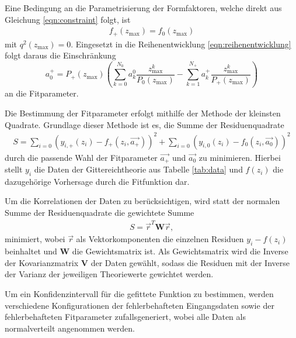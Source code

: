 Eine Bedingung an die Parametrisierung der Formfaktoren, welche direkt aus Gleichung \eqref{eqn:constraint} folgt, ist
\begin{align*}
  f_+(z_\text{max}) = f_0(z_\text{max})
\end{align*}
mit $q^2(z_\text{max}) = 0$.
Eingesetzt in die Reihenentwicklung \eqref{eqn:reihenentwicklung} folgt daraus die Einschränkung
\begin{equation}
  \label{eqn:einschr}
  a_0^+ = P_+(z_\text{max}) \left( \sum_{k=0}^{N_0} a_k^0 \frac{z_{\text{max}}^k}{P_0(z_\text{max})} - \sum_{k=1}^{N_+} a_k^+ \frac{z_{\text{max}}^k}{P_+(z_\text{max})} \right)
\end{equation}
an die Fitparameter.%

Die Bestimmung der Fitparameter erfolgt mithilfe der Methode der kleinsten Quadrate.
Grundlage dieser Methode ist es, die Summe der Residuenquadrate
\begin{align*}
  S = \sum_{i=0}^{} \left( y_{i,+}(z_i) - f_{+}(z_i, \vec{a_+}) \right)^2 + \sum_{i=0}^{} \left( y_{i,0}(z_i) - f_{0}(z_i, \vec{a_0}) \right)^2
\end{align*}
durch die passende Wahl der Fitparameter $\vec{a_+}$ und $\vec{a_0}$ zu minimieren.
Hierbei stellt $y_i$ die Daten der Gittereichtheorie aus Tabelle \ref{tab:data} und $f(z_i)$ die dazugehörige Vorhersage durch die Fitfunktion dar.

Um die Korrelationen der Daten zu berücksichtigen, wird statt der normalen Summe der Residuenquadrate die gewichtete Summe
\begin{align*}
  S = \vec{r}^T \symbf{W} \vec{r},
\end{align*}
minimiert, wobei $\vec{r}$ als Vektorkomponenten die einzelnen Residuen $y_i - f(z_i)$ beinhaltet und $\symbf{W}$ die Gewichtsmatrix ist.
Als Gewichtsmatrix wird die Inverse der Kovarianzmatrix $\symbf{V}$ der Daten gewählt, sodass die Residuen mit der Inverse der Varianz der jeweiligen Theoriewerte gewichtet werden.

Um ein Konfidenzintervall für die gefittete Funktion zu bestimmen, werden $$ verschiedene Konfigurationen der fehlerbehafteten Eingangsdaten sowie der fehlerbehafteten Fitparameter zufallsgeneriert, wobei alle Daten als normalverteilt angenommen werden.

